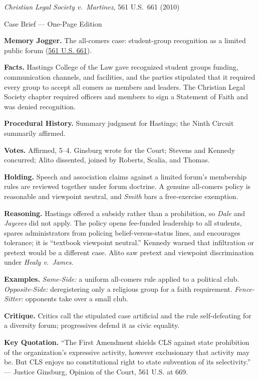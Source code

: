 \documentclass[12pt]{article}
\begin{document}
\begin{center}
{\Large \textit{Christian Legal Society v.\ Martinez}, 561 U.S.\ 661 (2010)\par}
\vspace{0.3em}
{\normalsize Case Brief --- One-Page Edition\par}
\end{center}

\textbf{Memory Jogger.} The all-comers case: student-group recognition as a limited public forum (\href{https://supreme.justia.com/cases/federal/us/561/661/}{561 U.S. 661}).

\textbf{Facts.} Hastings College of the Law gave recognized student groups funding, communication channels, and facilities, and the parties stipulated that it required every group to accept all comers as members and leaders. The Christian Legal Society chapter required officers and members to sign a Statement of Faith and was denied recognition.

\textbf{Procedural History.} Summary judgment for Hastings; the Ninth Circuit summarily affirmed.

\textbf{Votes.} Affirmed, 5--4. Ginsburg wrote for the Court; Stevens and Kennedy concurred; Alito dissented, joined by Roberts, Scalia, and Thomas.

\textbf{Holding.} Speech and association claims against a limited forum's membership rules are reviewed together under forum doctrine. A genuine all-comers policy is reasonable and viewpoint neutral, and \textit{Smith} bars a free-exercise exemption.

\textbf{Reasoning.} Hastings offered a subsidy rather than a prohibition, so \textit{Dale} and \textit{Jaycees} did not apply. The policy opens fee-funded leadership to all students, spares administrators from policing belief-versus-status lines, and encourages tolerance; it is ``textbook viewpoint neutral.'' Kennedy warned that infiltration or pretext would be a different case. Alito saw pretext and viewpoint discrimination under \textit{Healy v.\ James}.

\textbf{Examples.} \emph{Same-Side:} a uniform all-comers rule applied to a political club. \emph{Opposite-Side:} deregistering only a religious group for a faith requirement. \emph{Fence-Sitter:} opponents take over a small club.

\textbf{Critique.} Critics call the stipulated case artificial and the rule self-defeating for a diversity forum; progressives defend it as civic equality.

\textbf{Key Quotation.} ``The First Amendment shields CLS against state prohibition of the organization's expressive activity, however exclusionary that activity may be. But CLS enjoys no constitutional right to state subvention of its selectivity.'' --- Justice Ginsburg, Opinion of the Court, 561 U.S. at 669.
\end{document}
